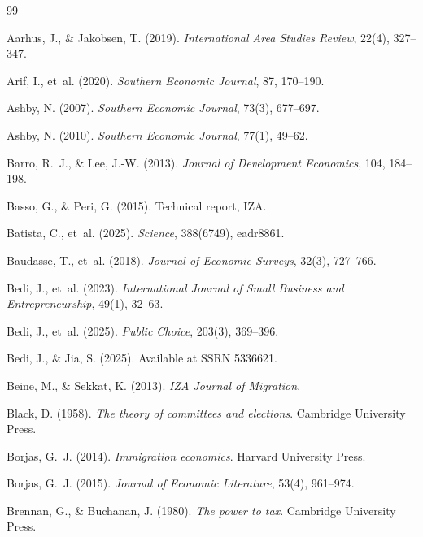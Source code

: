 \documentclass[12pt]{article}
\begin{document}
\begin{thebibliography}{99}

Aarhus, J., \& Jakobsen, T. (2019). \textit{International Area Studies Review}, 22(4), 327--347.

Arif, I., et~al. (2020). \textit{Southern Economic Journal}, 87, 170--190.

Ashby, N. (2007). \textit{Southern Economic Journal}, 73(3), 677--697.

Ashby, N. (2010). \textit{Southern Economic Journal}, 77(1), 49--62.

Barro, R.~J., \& Lee, J.-W. (2013). \textit{Journal of Development Economics}, 104, 184--198.

Basso, G., \& Peri, G. (2015). Technical report, IZA.

Batista, C., et~al. (2025). \textit{Science}, 388(6749), eadr8861.

Baudasse, T., et~al. (2018). \textit{Journal of Economic Surveys}, 32(3), 727--766.

Bedi, J., et~al. (2023). \textit{International Journal of Small Business and Entrepreneurship}, 49(1), 32--63.

Bedi, J., et~al. (2025). \textit{Public Choice}, 203(3), 369--396.

Bedi, J., \& Jia, S. (2025). Available at SSRN 5336621.

Beine, M., \& Sekkat, K. (2013). \textit{IZA Journal of Migration}.

Black, D. (1958). \textit{The theory of committees and elections}. Cambridge University Press.

Borjas, G.~J. (2014). \textit{Immigration economics}. Harvard University Press.

Borjas, G.~J. (2015). \textit{Journal of Economic Literature}, 53(4), 961--974.

Brennan, G., \& Buchanan, J. (1980). \textit{The power to tax}. Cambridge University Press.


\end{thebibliography}
\end{document}
